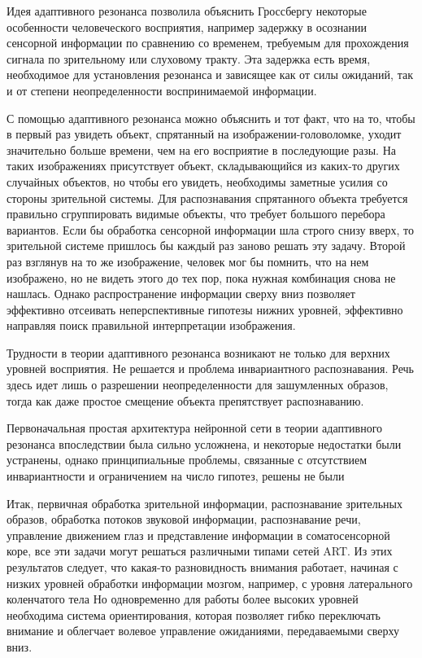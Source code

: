 \documentclass[14pt,a4paper,report]{article}
\begin{document}
Идея адаптивного резонанса позволила объяснить Гроссбергу некоторые особенности человеческого восприятия, например задержку в осознании сенсорной информации по сравнению со временем, требуемым для прохождения сигнала по зрительному или слуховому тракту. Эта задержка есть время, необходимое для установления резонанса и зависящее как от силы ожиданий, так и от степени неопределенности воспринимаемой информации.

С помощью адаптивного резонанса можно объяснить и тот факт, что на то, чтобы в первый раз увидеть объект, спрятанный на изображении-головоломке, уходит значительно больше времени, чем на его восприятие в последующие разы. На таких изображениях присутствует объект, складывающийся из каких-то других случайных объектов, но чтобы его увидеть, необходимы заметные усилия со стороны зрительной системы. Для распознавания спрятанного объекта требуется правильно сгруппировать видимые объекты, что требует большого перебора вариантов. Если бы обработка сенсорной информации шла строго снизу вверх, то зрительной системе пришлось бы каждый раз заново решать эту задачу. Второй раз взглянув на то же изображение, человек мог бы помнить, что на нем изображено, но не видеть этого до тех пор, пока нужная комбинация снова не нашлась. Однако распространение информации сверху вниз позволяет эффективно отсеивать неперспективные гипотезы нижних уровней, эффективно направляя поиск правильной интерпретации изображения.

Трудности в теории адаптивного резонанса возникают не только для верхних уровней восприятия. Не решается и проблема инвариантного распознавания. Речь здесь идет лишь о разрешении неопределенности для зашумленных образов, тогда как даже простое смещение объекта препятствует распознаванию.

Первоначальная простая архитектура нейронной сети в теории адаптивного резонанса впоследствии была сильно усложнена, и некоторые недостатки были устранены, однако принципиальные проблемы, связанные с отсутствием инвариантности и ограничением на число гипотез, решены не были \cite{cite-aideus-adapt}

Итак, первичная обработка зрительной информации, распознавание зрительных образов, обработка потоков звуковой информации, распознавание речи, управление движением глаз и представление информации в соматосенсорной коре, все эти задачи могут решаться различными типами сетей ART. Из этих результатов следует, что какая-то разновидность  внимания работает, начиная с низких уровней обработки информации мозгом, например, с уровня латерального коленчатого тела \cite{cite-scorcher-adapt} Но одновременно для работы более высоких уровней необходима система ориентирования, которая позволяет гибко переключать внимание и облегчает волевое управление ожиданиями, передаваемыми сверху вниз.
\end{document}
